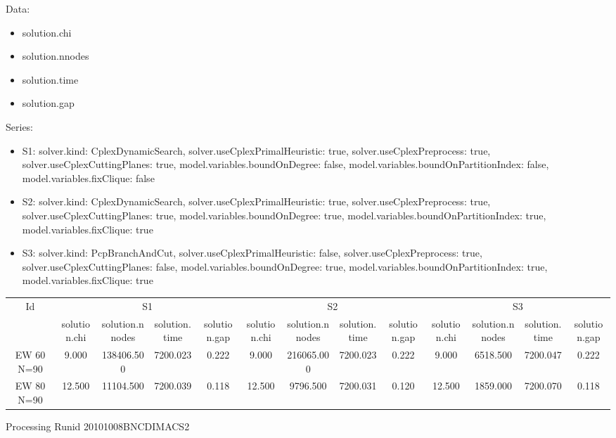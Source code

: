 \documentclass[landscape, 12pt]{report}
\begin{document}
Data:
\begin{itemize}
\item solution.chi
\item solution.nnodes
\item solution.time
\item solution.gap
\end{itemize}
Series:
\begin{itemize}
\item S1: solver.kind: CplexDynamicSearch, solver.useCplexPrimalHeuristic: true, solver.useCplexPreprocess: true, solver.useCplexCuttingPlanes: true, model.variables.boundOnDegree: false, model.variables.boundOnPartitionIndex: false, model.variables.fixClique: false
\item S2: solver.kind: CplexDynamicSearch, solver.useCplexPrimalHeuristic: true, solver.useCplexPreprocess: true, solver.useCplexCuttingPlanes: true, model.variables.boundOnDegree: true, model.variables.boundOnPartitionIndex: true, model.variables.fixClique: true
\item S3: solver.kind: PcpBranchAndCut, solver.useCplexPrimalHeuristic: false, solver.useCplexPreprocess: true, solver.useCplexCuttingPlanes: false, model.variables.boundOnDegree: true, model.variables.boundOnPartitionIndex: true, model.variables.fixClique: true
\end{itemize}
\begin{tabular}{|c|cccc|cccc|cccc|}
\hline
\multicolumn{1}{|c|}{Id} & \multicolumn{4}{|c|}{S1} & \multicolumn{4}{|c|}{S2} & \multicolumn{4}{|c|}{S3}
\\
 & solution.chi & solution.nnodes & solution.time & solution.gap & solution.chi & solution.nnodes & solution.time & solution.gap & solution.chi & solution.nnodes & solution.time & solution.gap
\\
\hline
EW 60 N=90 & 9.000 & 138406.500 & 7200.023 & 0.222 & 9.000 & 216065.000 & 7200.023 & 0.222 & 9.000 & 6518.500 & 7200.047 & 0.222
\\
EW 80 N=90 & 12.500 & 11104.500 & 7200.039 & 0.118 & 12.500 & 9796.500 & 7200.031 & 0.120 & 12.500 & 1859.000 & 7200.070 & 0.118
\\
\hline 
 \end{tabular}


Processing Runid 20101008BNCDIMACS2
\end{document}
